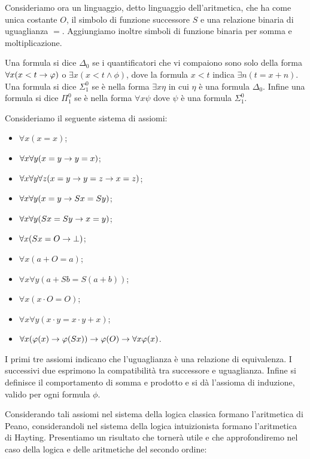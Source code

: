 \documentclass[]{marticle}
\begin{document}
Consideriamo ora un linguaggio, detto linguaggio dell'aritmetica, che ha come
unica costante $O$, il simbolo di funzione successore $S$ e una relazione
binaria di uguaglianza $=$.
Aggiungiamo inoltre simboli di funzione binaria per somma e moltiplicazione.

Una formula si dice $\Delta_0$ se i quantificatori che vi compaiono sono solo
della forma $\forall x (x < t \rightarrow \varphi)$ o $\exists x (x < t \land \phi)$, dove
la formula $x<t$ indica $\exists n (t = x+n)$. Una formula si dice $\Sigma^0_1$
se \`e nella forma $\exists x \eta$ in cui $\eta$ \`e una formula $\Delta_0$.
Infine una formula si dice $\Pi^0_1$ se \`e nella forma $\forall x \psi$ dove
$\psi$ \`e una formula $\Sigma^0_1$.

Consideriamo il seguente sistema di assiomi:
\begin{itemize}
    \item $\forall x (x=x)$;
    \item $\forall x \forall y (x=y\rightarrow y=x)$;
    \item $\forall x \forall y \forall z (x=y \rightarrow y=z \rightarrow x=z)$;
    \item $\forall x \forall y (x=y \rightarrow Sx=Sy)$;
    \item $\forall x \forall y (Sx=Sy \rightarrow x=y)$;
    \item $\forall x (Sx=O \rightarrow \bot)$;
    \item $\forall x (a+O = a)$;
    \item $\forall x \forall y (a+Sb = S(a+b))$;
    \item $\forall x (x\cdot O = O)$;
    \item $\forall x \forall y (x\cdot y = x\cdot y + x)$;
    \item $\forall x (\varphi(x) \rightarrow \varphi(Sx)) \rightarrow \varphi(O) \rightarrow \forall x
        \varphi(x)$.
\end{itemize}

I primi tre assiomi indicano che l'uguaglianza \`e una relazione di equivalenza.
I successivi due esprimono la compatibilit\`a tra successore e uguaglianza.
Infine si definisce il comportamento di somma e prodotto e si d\`a l'assioma di
induzione, valido per ogni formula $\phi$.

Considerando tali assiomi nel sistema della logica classica formano l'aritmetica
di Peano, considerandoli nel sistema della logica intuizionista formano
l'aritmetica di Hayting. Presentiamo un risultato che torner\`a utile e che
approfondiremo nel caso della logica e delle aritmetiche del secondo ordine:
\end{document}
